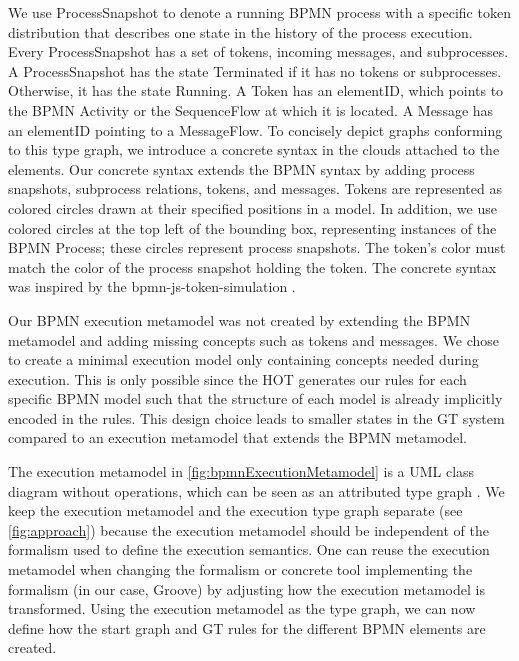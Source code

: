 \documentclass{lmcs} %
\begin{document}
We use \textsf{ProcessSnapshot} to denote a running BPMN process with a specific token distribution that describes one state in the history of the process execution.
Every \textsf{ProcessSnapshot} has a set of \textsf{tokens}, incoming \textsf{messages}, and \textsf{subprocesses}.
A \textsf{ProcessSnapshot} has the state \textsf{Terminated} if it has no \textsf{tokens} or \textsf{subprocesses}.
Otherwise, it has the state \textsf{Running}.
A \textsf{Token} has an \textsf{elementID}, which points to the BPMN \textsf{Activity} or the \textsf{SequenceFlow} at which it is located.
A \textsf{Message} has an \textsf{elementID} pointing to a \textsf{MessageFlow}.
To concisely depict graphs conforming to this type graph, we introduce a concrete syntax in the clouds attached to the elements.
Our concrete syntax extends the BPMN syntax by adding process snapshots, subprocess relations, tokens, and messages.
Tokens are represented as colored circles drawn at their specified positions in a model.
In addition, we use colored circles at the top left of the bounding box, representing instances of the BPMN \textsf{Process}; these circles represent process snapshots.
The token's color must match the color of the process snapshot holding the token.
The concrete syntax was inspired by the bpmn-js-token-simulation \cite{camundaservicesgmbhBpmnjsTokenSimulation2023}.

Our BPMN execution metamodel was not created by extending the BPMN metamodel and adding missing concepts such as tokens and messages.
We chose to create a minimal execution model only containing concepts needed during execution.
This is only possible since the HOT generates our rules for each specific BPMN model such that the structure of each model is already implicitly encoded in the rules.
This design choice leads to smaller states in the GT system compared to an execution metamodel that extends the BPMN metamodel.

The execution metamodel in \autoref{fig:bpmnExecutionMetamodel} is a UML class diagram without operations, which can be seen as an attributed type graph \cite{heckelGraphTransformationSoftware2020}.
We keep the execution metamodel and the execution type graph separate (see \autoref{fig:approach}) because the execution metamodel should be independent of the formalism used to define the execution semantics.
One can reuse the execution metamodel when changing the formalism or concrete tool implementing the formalism (in our case, Groove) by adjusting how the execution metamodel is transformed.
Using the execution metamodel as the type graph, we can now define how the start graph and GT rules for the different BPMN elements are created.
\end{document}
